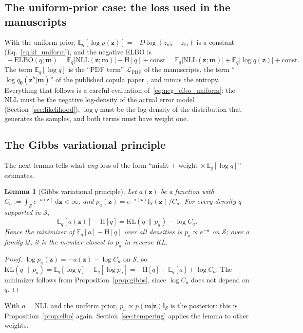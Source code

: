 \documentclass[11pt,a4paper]{article}
\numberwithin{equation}{section}
\theoremstyle{plain}
\newtheorem{lemma}[proposition]{Lemma}
\theoremstyle{definition}
\theoremstyle{remark}
\newcommand{\m}{\mathbf{m}}
\newcommand{\z}{\mathbf{z}}
\newcommand{\thetab}{\bm{\theta}}
\newcommand{\Sset}{\mathcal{S}}
\newcommand{\E}{\mathbb{E}}
\newcommand{\KL}{\mathrm{KL}}
\newcommand{\Hent}{\mathrm{H}}
\newcommand{\ELBO}{\mathrm{ELBO}}
\newcommand{\NLL}{\mathrm{NLL}}
\newcommand{\Lc}{\mathcal{L}}
\newcommand{\dd}{\,\mathrm{d}}
\newcommand{\zlb}{z_{\text{lb}}}
\newcommand{\zub}{z_{\text{ub}}}
\newcommand{\ind}{\mathbb{I}}
\begin{document}
\subsection{The uniform-prior case: the loss used in the manuscripts}
With the uniform prior, $\E_q[\log p(\z)]=-D\log(\zub-\zlb)$ is a constant (Eq.~\eqref{eq:kl_uniform}), and the negative ELBO is
\begin{equation}
\boxed{\ -\ELBO(q;\m)=\E_q\big[\NLL(\z;\m)\big]-\Hent[q]+\text{const}
=\E_q\big[\NLL(\z;\m)\big]+\E_q\big[\log q(\z)\big]+\text{const}.\ }
\label{eq:neg_elbo_uniform}
\end{equation}
The term $\E_q[\log q]$ is the ``PDF term'' $\Lc_{\text{PDF}}$ of the manuscripts, the term ``$\log q_{\thetab}(\z^h|\m)$'' of the published copula paper \cite{fernandez2026pem}, and minus the entropy.
Everything that follows is a careful evaluation of~\eqref{eq:neg_elbo_uniform}: the NLL must be the negative log-density of the actual error model (Section~\ref{sec:likelihood}), $\log q$ must be the log-density of the distribution that generates the samples, and both terms must have weight one.

\subsection{The Gibbs variational principle}
The next lemma tells what \emph{any} loss of the form ``misfit $+$ weight $\times\,\E_q[\log q]$'' estimates.
\begin{lemma}[Gibbs variational principle]
\label{lem:gibbs_principle}
Let $a(\z)$ be a function with $C_a:=\int_{\Sset} e^{-a(\z)}\dd\z<\infty$, and $p_a(\z)=e^{-a(\z)}\ind_{\Sset}(\z)/C_a$. For every density $q$ supported in $\Sset$,
\begin{equation}
\E_q[a(\z)]-\Hent[q]=\KL(q\,\|\,p_a)-\log C_a.
\end{equation}
Hence the minimizer of $\E_q[a]-\Hent[q]$ over all densities is $p_a\propto e^{-a}$ on $\Sset$; over a family $\mathcal Q$, it is the member closest to $p_a$ in reverse KL.
\end{lemma}
\begin{proof}
$\log p_a(\z)=-a(\z)-\log C_a$ on $\Sset$, so $\KL(q\,\|\,p_a)=\E_q[\log q]-\E_q[\log p_a]=-\Hent[q]+\E_q[a]+\log C_a$. The minimizer follows from Proposition~\ref{prop:gibbs}, since $\log C_a$ does not depend on $q$.
\end{proof}
With $a=\NLL$ and the uniform prior, $p_a\propto p(\m|\z)\ind_{\Sset}$ is the posterior: this is Proposition~\ref{prop:elbo} again. Section~\ref{sec:tempering} applies the lemma to other weights.
\end{document}
